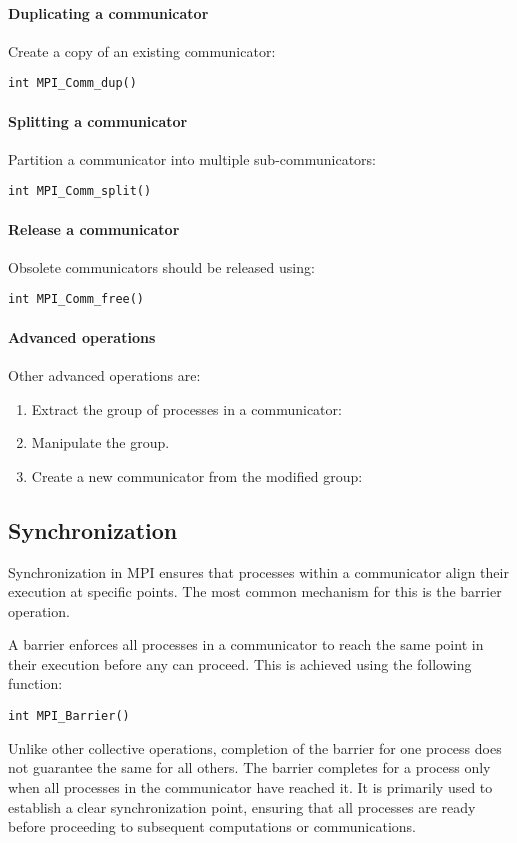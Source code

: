 \paragraph*{Duplicating a communicator}
Create a copy of an existing communicator:
\begin{lstlisting}[style=C]
int MPI_Comm_dup()
\end{lstlisting}

\paragraph*{Splitting a communicator}
Partition a communicator into multiple sub-communicators:
\begin{lstlisting}[style=C]
int MPI_Comm_split()
\end{lstlisting}

\paragraph*{Release a communicator}
Obsolete communicators should be released using:
\begin{lstlisting}[style=C]
int MPI_Comm_free()
\end{lstlisting}

\paragraph*{Advanced operations}
Other advanced operations are: 
\begin{enumerate}
    \item Extract the group of processes in a communicator: 
    \item Manipulate the group. 
    \item Create a new communicator from the modified group: 
\end{enumerate}

\subsection{Synchronization}
Synchronization in MPI ensures that processes within a communicator align their execution at specific points. 
The most common mechanism for this is the barrier operation.

A barrier enforces all processes in a communicator to reach the same point in their execution before any can proceed. 
This is achieved using the following function:
\begin{lstlisting}[style=C]
int MPI_Barrier()
\end{lstlisting}
Unlike other collective operations, completion of the barrier for one process does not guarantee the same for all others. 
The barrier completes for a process only when all processes in the communicator have reached it.
It is primarily used to establish a clear synchronization point, ensuring that all processes are ready before proceeding to subsequent computations or communications.

